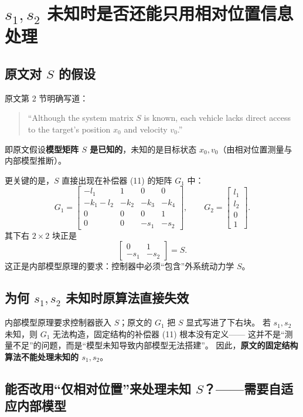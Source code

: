
\section{$s_1,s_2$ 未知时是否还能只用相对位置信息处理}

\subsection{原文对 $S$ 的假设}

原文第 2 节明确写道：
\begin{quote}
“Although the system matrix $S$ is known, each vehicle lacks direct access
to the target's position $x_0$ and velocity $v_0$.”
\end{quote}
即原文假设\textbf{模型矩阵 $S$ 是已知的}，未知的是目标状态 $x_0,v_0$（由相对位置测量与内部模型推断）。

更关键的是，$S$ 直接出现在补偿器 (11) 的矩阵 $G_1$ 中：
\[
G_1 = \begin{bmatrix}
-l_1 & 1 & 0 & 0\\
-k_1-l_2 & -k_2 & -k_3 & -k_4\\
0 & 0 & 0 & 1\\
0 & 0 & -s_1 & -s_2
\end{bmatrix},\qquad
G_2 = \begin{bmatrix} l_1 \\ l_2 \\ 0 \\ 1\end{bmatrix}.
\]
其下右 $2\times2$ 块正是
\[
\begin{bmatrix}0&1\\ -s_1&-s_2\end{bmatrix}=S.
\]
这正是内部模型原理的要求：控制器中必须“包含”外系统动力学 $S$。

\subsection{为何 $s_1,s_2$ 未知时原算法直接失效}

内部模型原理要求控制器嵌入 $S$；原文的 $G_1$ 把 $S$ 显式写进了下右块。
若 $s_1,s_2$ 未知，则 $G_1$ 无法构造，固定结构的补偿器 (11) 根本没有定义——
这并不是“测量不足”的问题，而是“模型未知导致内部模型无法搭建”。
因此，\textbf{原文的固定结构算法不能处理未知的 $s_1,s_2$}。

\subsection{能否改用“仅相对位置”来处理未知 $S$？——需要自适应内部模型}

